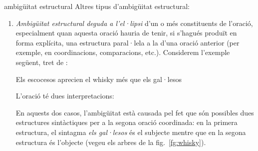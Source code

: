 \begin{persabermes}{ambigüitat estructural}
  Altres tipus d'ambigüitat estructural:
  \begin{enumerate}
  \item \emph{Ambigüitat estructural deguda a l'el·lipsi} d'un o més
    constituents de l'oració, especialment quan aquesta oració hauria
    de tenir, si s'hagués produït en forma explícita, una estructura
    paral·lela a la d'una oració anterior (per exemple, en
    coordinacions, comparacions, etc.).   Considerem l'exemple següent, tret de
    \citet[p.~399]{radford09b}:
    \begin{exemple}
      \label{eq:escocesos}
      Els escocesos aprecien el whisky més que els gal·lesos
    \end{exemple} L'oració té dues interpretacions:
    En aquests dos casos, l'ambigüitat està causada pel fet que són
    possibles dues estructures sintàctiques per a la segona oració
    coordinada: en la primera estructura, el sintagma \emph{els
      gal·lesos} és el subjecte mentre que en la segona estructura és
    l'objecte (vegeu els arbres de la fig.~\ref{fg:whisky}).


\end{enumerate}
\end{persabermes}
